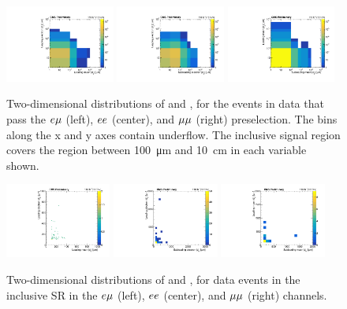 \begin{figure}
\centering
\includegraphics[width=0.32\textwidth]{figures/results/d0vsd0_emu_CMSPreliminary.pdf}
\includegraphics[width=0.32\textwidth]{figures/results/d0vsd0_ee_CMSPreliminary.pdf}
\includegraphics[width=0.32\textwidth]{figures/results/d0vsd0_mumu_CMSPreliminary.pdf}
\caption{
Two-dimensional distributions of \ada and \adb, for the events in data that pass the $e{\mu}$ (left), $ee$ (center), and ${\mu}{\mu}$ (right) preselection. The bins along the x and y axes contain underflow. The inclusive signal region covers the region between \SI{100}{\um} and \SI{10}{\cm} in each \ad variable shown.
}
\label{d0_d0_data}
\end{figure}

\begin{figure}
\centering
\includegraphics[width=0.31\textwidth]{figures/results/electronAbsD0[0]_vs_muonAbsD0[0]_1000um.pdf}
\includegraphics[width=0.31\textwidth]{figures/results/electronAbsD0[0]_vs_electronAbsD0[1]_10000um.pdf}
\includegraphics[width=0.31\textwidth]{figures/results/muonAbsD0[0]_vs_muonAbsD0[1]_10000um.pdf}
\caption{
Two-dimensional distributions of \ada and \adb, for data events in the inclusive SR in the $e{\mu}$ (left), $ee$ (center), and ${\mu}{\mu}$ (right) channels.
}
\label{d0_d0_sr_data}
\end{figure}